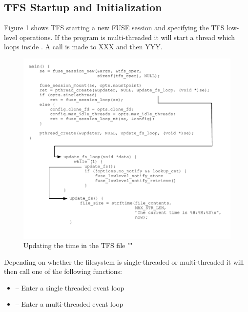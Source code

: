 
\subsection{TFS Startup and Initialization}

Figure \ref{fig:tfs-fuse} shows TFS starting a new FUSE session and specifying the TFS low-level operations. If the program is multi-threaded it will start a thread which loops inside . A call is made to XXX and then YYY.

\noindent

\begin{figure}[h]
	\includegraphics[scale=0.6]{figures/tfs-fuse.pdf}
	\centering
	\caption{Updating the time in the TFS file ""}
	\label{fig:tfs-fuse}
\end{figure}

Depending on whether the filesystem is single-threaded or multi-threaded it will then call one of the following functions:

\begin{itemize}
	\item {} -- Enter a single threaded event loop
	\item {} -- Enter a multi-threaded event loop
\end{itemize}

